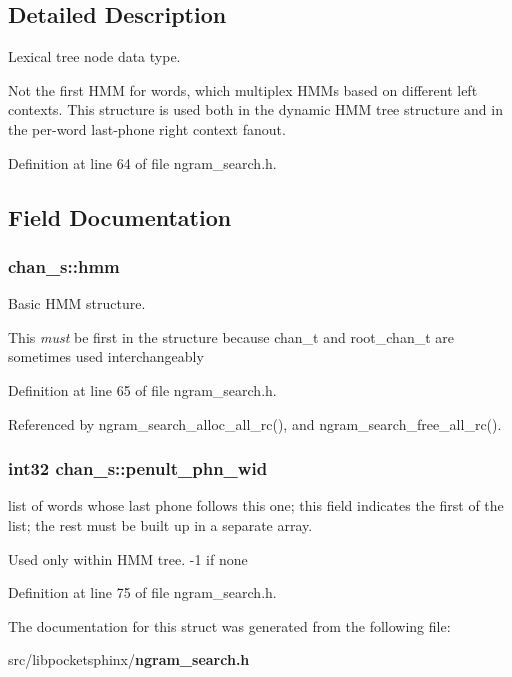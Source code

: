 \subsection{Detailed Description}
Lexical tree node data type. 

Not the first H\-M\-M for words, which multiplex H\-M\-Ms based on different left contexts. This structure is used both in the dynamic H\-M\-M tree structure and in the per-\/word last-\/phone right context fanout. 

Definition at line 64 of file ngram\-\_\-search.\-h.



\subsection{Field Documentation}
\subsubsection[{hmm}]{ chan\-\_\-s\-::hmm}\label{structchan__s_a742d6a125ac468b95a1ddd880a956e35}


Basic H\-M\-M structure. 

This {\itshape must} be first in the structure because chan\-\_\-t and root\-\_\-chan\-\_\-t are sometimes used interchangeably 

Definition at line 65 of file ngram\-\_\-search.\-h.



Referenced by ngram\-\_\-search\-\_\-alloc\-\_\-all\-\_\-rc(), and ngram\-\_\-search\-\_\-free\-\_\-all\-\_\-rc().

\subsubsection[{penult\-\_\-phn\-\_\-wid}]{\setlength{\rightskip}{0pt plus 5cm}int32 chan\-\_\-s\-::penult\-\_\-phn\-\_\-wid}\label{structchan__s_a136796f6a13c0d6989120f9aa25b85f1}


list of words whose last phone follows this one; this field indicates the first of the list; the rest must be built up in a separate array. 

Used only within H\-M\-M tree. -\/1 if none 

Definition at line 75 of file ngram\-\_\-search.\-h.



The documentation for this struct was generated from the following file\-:\begin{DoxyCompactItemize}
\item 
src/libpocketsphinx/{\bf ngram\-\_\-search.\-h}\end{DoxyCompactItemize}
